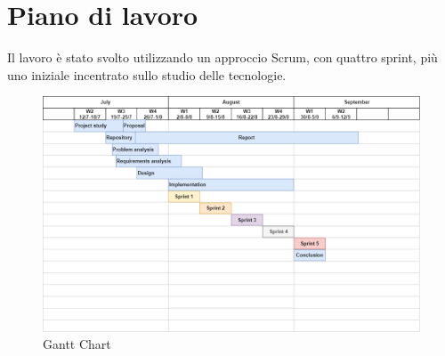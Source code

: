 

\chapter{Piano di lavoro}
Il lavoro è stato svolto utilizzando un approccio Scrum, con quattro sprint, più uno iniziale incentrato sullo studio delle tecnologie.
\begin{figure}[H]
    \caption{Gantt Chart}
    \label{fig:Gantt}
    \centering
    \includegraphics[width=1\textwidth]{DrawIo/GanttChart.png}
\end{figure}